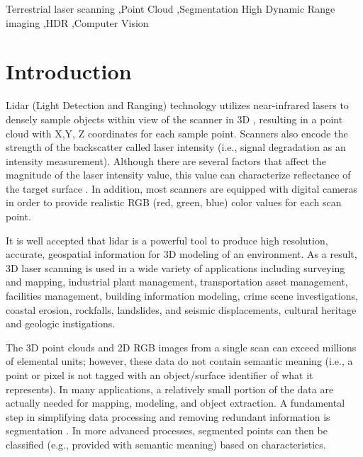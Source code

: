 \documentclass[final,3p,times,twocolumn,authoryear]{elsarticle}
\begin{document}
\begin{frontmatter}
\begin{abstract}
\end{abstract}

\begin{keyword}
Terrestrial laser scanning \sep Point Cloud \sep Segmentation High Dynamic Range imaging \sep HDR \sep Computer Vision 


\end{keyword}
 
\end{frontmatter}

\linenumbers


\section{Introduction}
Lidar (Light Detection and Ranging) technology utilizes near-infrared lasers to densely sample objects within view of the scanner in 3D \cite{vosselman2010}, resulting in a point cloud with X,Y, Z coordinates for each sample point. Scanners also encode the strength of the backscatter called laser intensity (i.e., signal degradation as an intensity measurement).   
Although there are several factors that affect the magnitude of the laser intensity value, this value can characterize reflectance of the target surface \cite{kaasalainen2011,kashani2015}. In addition, most scanners are equipped with digital cameras in order to provide realistic RGB (red, green, blue) color values for each scan point.  

It is well accepted that lidar is a powerful tool to produce high resolution, accurate, geospatial information for 3D modeling of an environment. As a result, 3D laser scanning is used in a wide variety of applications including surveying and mapping, industrial plant management, transportation asset management, facilities management, building information modeling, crime scene investigations, coastal erosion, rockfalls, landslides, and seismic displacements, cultural heritage and geologic instigations.

The 3D point clouds and 2D RGB images from a single scan can exceed millions of elemental units; however, these data do not contain semantic meaning (i.e., a point or pixel is not tagged with an object/surface identifier of what it represents). In many applications, a relatively small portion of the data are actually needed for mapping, modeling, and object extraction. A fundamental step in simplifying data processing and removing redundant information is segmentation \cite{vosselman2010}.  In more advanced processes, segmented points can then be classified (e.g., provided with semantic meaning) based on characteristics. 
\end{document}

